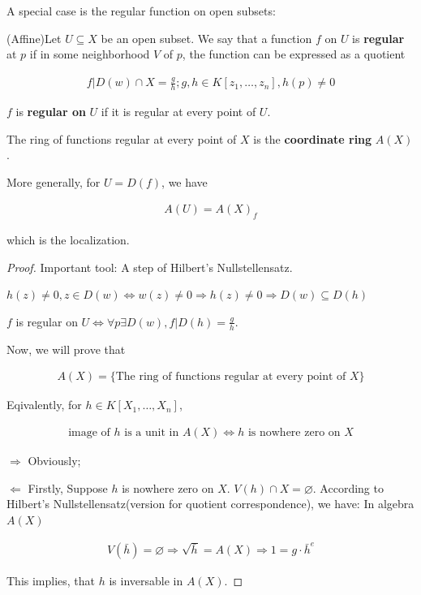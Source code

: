 \documentclass[Total.tex]{subfiles}
\begin{document}
				A special case is the regular function on open subsets:
				
				\begin{Def}
					(Affine)Let $U\subseteq X$ be an open subset. We say that a function $f$ on $U$ is \textbf{regular} at $p$ if in some neighborhood $V$ of $p$, the function can be expressed as a quotient
					
					\begin{gather*}
						f|D(w)\cap X=\frac{g}{h};g,h\in K[z_1,\dots,z_n],h(p)\not=0
					\end{gather*}
					
					$f$ is \textbf{regular on }$U$ if it is regular at every point of $U$.
				\end{Def}
				
				\begin{lemma}
					The ring of functions regular at every point of $X$ is the \textbf{coordinate ring} $A(X)$. 
					
					More generally, for $U=D(f)$, we have
					
					\begin{gather*}
						A(U)=A(X)_f
					\end{gather*}
					
					which is the localization.
				\end{lemma}
				
				\begin{proof}
					Important tool: A step of Hilbert's Nullstellensatz. 
					
					$h(z)\not=0,z\in D(w)\Leftrightarrow w(z)\not=0\Rightarrow h(z)\not=0\Rightarrow D(w)\subseteq D(h)$
					
					$f$ is regular on $U\Leftrightarrow \forall p\exists D(w),f|D(h)=\frac{g}{h}$.
					
					Now, we will prove that
					
					\begin{gather*}
						A(X)=\{\mbox{The ring of functions regular at every point of }X\}
					\end{gather*}
					
					Eqivalently, for $h\in K[X_1,\dots,X_n]$,
					
					\begin{gather*}
						\mbox{image of }h\mbox{ is a unit in }A(X)\Leftrightarrow h\mbox{ is nowhere zero on }X
					\end{gather*}
					
					$\Rightarrow$ Obviously; 
					
					$\Leftarrow$ Firstly, Suppose $h$ is nowhere zero on $X$. $V(h)\cap X=\varnothing$. According to Hilbert's Nullstellensatz(version for quotient correspondence), we have: In algebra $A(X)$
					
					\begin{gather*}
						V(\bar{h})=\varnothing\Rightarrow \sqrt{\bar{h}}=A(X)\Rightarrow 1=g\cdot \bar{h}^e
					\end{gather*}
					
					This implies, that $h$ is inversable in $A(X)$.
					
					
				\end{proof}
				
\end{document}
